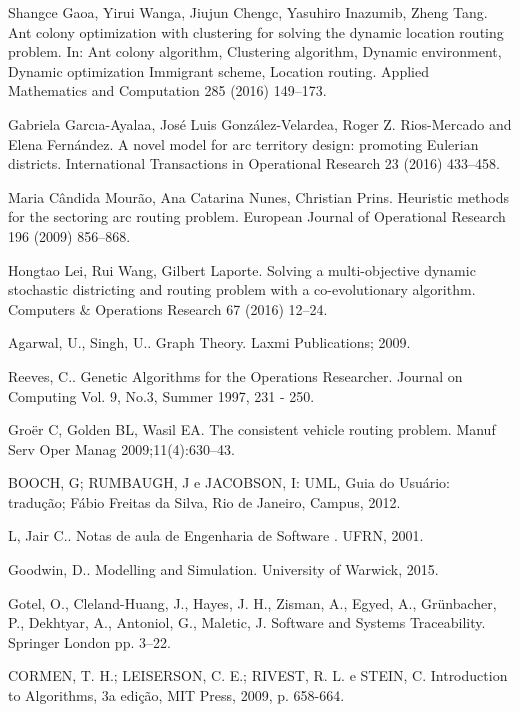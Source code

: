 \documentclass[12pt]{elsarticle}
\begin{document}
	\begin{thebibliography}{1}
    
Shangce Gaoa, Yirui Wanga, Jiujun Chengc, Yasuhiro Inazumib, Zheng Tang. Ant colony optimization with clustering for solving the dynamic location routing problem. In: Ant colony algorithm, Clustering algorithm, Dynamic environment, Dynamic optimization Immigrant scheme, Location routing. Applied Mathematics and Computation 285 (2016) 149–173.

Gabriela Garcıa-Ayalaa, José Luis González-Velardea, Roger Z. Rios-Mercado and Elena Fernández. A novel model for arc territory design: promoting Eulerian districts. International Transactions in Operational Research 23 (2016) 433–458.


Maria Cândida Mourão, Ana Catarina Nunes, Christian Prins. Heuristic methods for the sectoring arc routing problem. European Journal of Operational Research 196 (2009) 856–868.

Hongtao Lei, Rui Wang, Gilbert Laporte. Solving a multi-objective dynamic stochastic districting and routing problem with a co-evolutionary algorithm. Computers \& Operations Research 67 (2016) 12–24.

Agarwal, U., Singh, U.. Graph Theory. Laxmi Publications; 2009.

Reeves, C.. Genetic Algorithms for the Operations Researcher. Journal on Computing Vol. 9, No.3, Summer 1997, 231 - 250.

Groër C, Golden BL, Wasil EA. The consistent vehicle routing problem. Manuf Serv Oper Manag 2009;11(4):630–43.

BOOCH, G; RUMBAUGH, J e JACOBSON, I: UML, Guia do Usuário: tradução; Fábio Freitas da Silva, Rio de Janeiro, Campus, 2012.

L, Jair C.. Notas de aula de Engenharia de Software . UFRN, 2001.

Goodwin, D.. Modelling and Simulation. University of Warwick, 2015.

Gotel, O., Cleland-Huang, J., Hayes, J. H., Zisman, A., Egyed, A., Grünbacher, P., Dekhtyar, A., Antoniol, G., Maletic, J. Software and Systems Traceability. Springer London pp. 3–22.

CORMEN, T. H.; LEISERSON, C. E.; RIVEST, R. L. e STEIN, C. Introduction to Algorithms, 3a edição, MIT Press, 2009, p. 658-664.

	\end{thebibliography}
	
\end{document}
